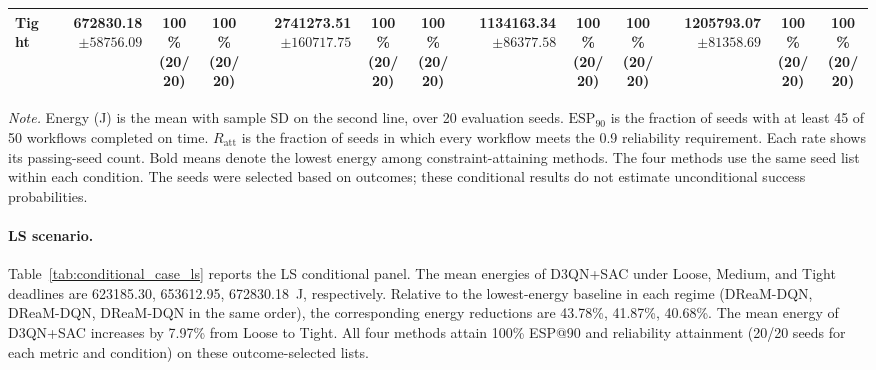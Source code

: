 \begin{table}[!t]
\begin{tabular}{@{}l*{4}{rcc}@{}}
Tight & \shortstack[r]{\textbf{672830.18}\\$\pm 58756.09$} & \shortstack[c]{100\%\\(20/20)} & \shortstack[c]{100\%\\(20/20)} & \shortstack[r]{2741273.51\\$\pm 160717.75$} & \shortstack[c]{100\%\\(20/20)} & \shortstack[c]{100\%\\(20/20)} & \shortstack[r]{1134163.34\\$\pm 86377.58$} & \shortstack[c]{100\%\\(20/20)} & \shortstack[c]{100\%\\(20/20)} & \shortstack[r]{1205793.07\\$\pm 81358.69$} & \shortstack[c]{100\%\\(20/20)} & \shortstack[c]{100\%\\(20/20)} \\
\bottomrule
\end{tabular}
\par\vspace{3pt}
\parbox{\textwidth}{\footnotesize
\textit{Note.} Energy (J) is the mean with sample SD on the second line, over 20 evaluation seeds.
$\mathrm{ESP}_{90}$ is the fraction of seeds with at least 45 of 50 workflows completed on time.
$R_{\mathrm{att}}$ is the fraction of seeds in which every workflow meets the 0.9 reliability requirement.
Each rate shows its passing-seed count. Bold means denote the lowest energy among constraint-attaining methods.
The four methods use the same seed list within each condition.
The seeds were selected based on outcomes; these conditional results do not estimate unconditional success probabilities.}
\endgroup
\end{table}

\paragraph{LS scenario.}
Table~\ref{tab:conditional_case_ls} reports the LS conditional panel. The mean energies of D3QN+SAC under Loose, Medium, and Tight deadlines are 623185.30, 653612.95, 672830.18~J, respectively. Relative to the lowest-energy baseline in each regime (DReaM-DQN, DReaM-DQN, DReaM-DQN in the same order), the corresponding energy reductions are 43.78\%, 41.87\%, 40.68\%. The mean energy of D3QN+SAC increases by 7.97\% from Loose to Tight. All four methods attain 100\% ESP@90 and reliability attainment (20/20 seeds for each metric and condition) on these outcome-selected lists.

